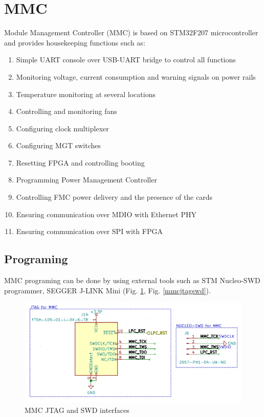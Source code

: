 \documentclass[12pt,oneside,a4]{article}
\begin{document}
\section{MMC}\label{sec:MMC}
Module Management Controller (MMC) is based on STM32F207 microcontroller and provides housekeeping functions such as:
\begin{enumerate}
	\item Simple UART console over USB-UART bridge to control all functions
	\item Monitoring voltage, current consumption and warning signals on power rails
	\item Temperature monitoring at several locations
	\item Controlling and monitoring fans
	\item Configuring clock multiplexer
	\item Configuring MGT switches
	\item Resetting FPGA and controlling booting
	\item Programming Power Management Controller
	\item Controlling FMC power delivery and the presence of the cards
	\item Ensuring communication over MDIO with Ethernet PHY
	\item Ensuring communication over SPI with FPGA
\end{enumerate}

\subsection{Programing}\label{sec:MMC:Programming}
MMC programing can be done by using external tools such as STM Nucleo-SWD programmer, SEGGER J-LINK Mini (Fig. \ref{mmcjtag}, Fig. \ref{mmcjtagswd}).

\begin{figure}[H]
\begin{center}
\includegraphics[width=1\linewidth]{mmcjtag.png}
 \caption{MMC JTAG and SWD interfaces}\label{mmcjtag}
\end{center}
\end{figure}
\end{document}

